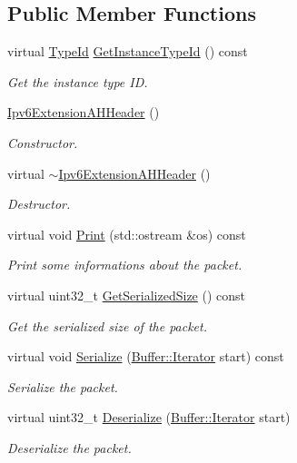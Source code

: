 \subsection*{Public Member Functions}
\begin{DoxyCompactItemize}
\item 
virtual \hyperlink{classns3_1_1TypeId}{Type\+Id} \hyperlink{classns3_1_1Ipv6ExtensionAHHeader_a692f5fa94abc2d9ce79df3446c0229e0}{Get\+Instance\+Type\+Id} () const 
\begin{DoxyCompactList}\small\item\em Get the instance type ID. \end{DoxyCompactList}\item 
\hyperlink{classns3_1_1Ipv6ExtensionAHHeader_ac608b8ea98edffd2074ce1017d9a67fb}{Ipv6\+Extension\+A\+H\+Header} ()
\begin{DoxyCompactList}\small\item\em Constructor. \end{DoxyCompactList}\item 
virtual \hyperlink{classns3_1_1Ipv6ExtensionAHHeader_a738997adfc85833dd2d349fd78d4fe07}{$\sim$\+Ipv6\+Extension\+A\+H\+Header} ()
\begin{DoxyCompactList}\small\item\em Destructor. \end{DoxyCompactList}\item 
virtual void \hyperlink{classns3_1_1Ipv6ExtensionAHHeader_a64519a7d0ef3482eff620c960ee31c68}{Print} (std\+::ostream \&os) const 
\begin{DoxyCompactList}\small\item\em Print some informations about the packet. \end{DoxyCompactList}\item 
virtual uint32\+\_\+t \hyperlink{classns3_1_1Ipv6ExtensionAHHeader_abb7246b1272f0ca322a7be42ff86f430}{Get\+Serialized\+Size} () const 
\begin{DoxyCompactList}\small\item\em Get the serialized size of the packet. \end{DoxyCompactList}\item 
virtual void \hyperlink{classns3_1_1Ipv6ExtensionAHHeader_a903f2117b1810f9fdd66558517c0cf5c}{Serialize} (\hyperlink{classns3_1_1Buffer_1_1Iterator}{Buffer\+::\+Iterator} start) const 
\begin{DoxyCompactList}\small\item\em Serialize the packet. \end{DoxyCompactList}\item 
virtual uint32\+\_\+t \hyperlink{classns3_1_1Ipv6ExtensionAHHeader_a5967c93fc818a0e3314f10f777c7c9c8}{Deserialize} (\hyperlink{classns3_1_1Buffer_1_1Iterator}{Buffer\+::\+Iterator} start)
\begin{DoxyCompactList}\small\item\em Deserialize the packet. \end{DoxyCompactList}\end{DoxyCompactItemize}
